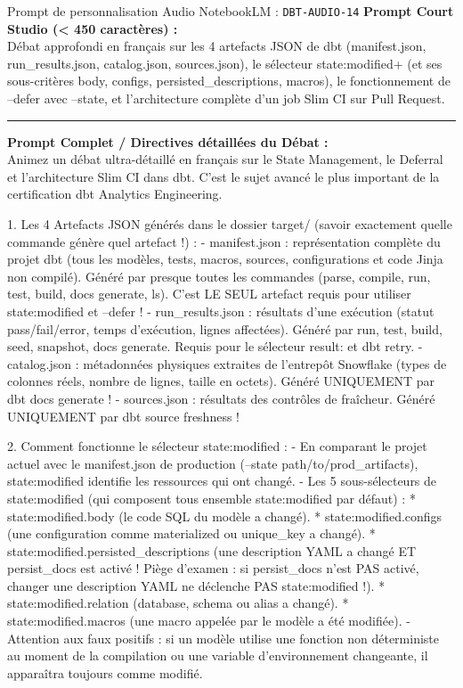 \documentclass[11pt,a4paper]{article}
\begin{document}
\begin{promptbox}{Prompt de personnalisation Audio NotebookLM : \texttt{DBT-AUDIO-14}}
\textbf{Prompt Court Studio (< 450 caractères) :}\\
Débat approfondi en français sur les 4 artefacts JSON de dbt (manifest.json, run\_results.json, catalog.json, sources.json), le sélecteur state:modified+ (et ses sous-critères body, configs, persisted\_descriptions, macros), le fonctionnement de --defer avec --state, et l'architecture complète d'un job Slim CI sur Pull Request.

\medskip\hrule\medskip
\textbf{Prompt Complet / Directives détaillées du Débat :}\\
Animez un débat ultra-détaillé en français sur le State Management, le Deferral et l'architecture Slim CI dans dbt. C'est le sujet avancé le plus important de la certification dbt Analytics Engineering.

1. Les 4 Artefacts JSON générés dans le dossier target/ (savoir exactement quelle commande génère quel artefact !) :
- manifest.json : représentation complète du projet dbt (tous les modèles, tests, macros, sources, configurations et code Jinja non compilé). Généré par presque toutes les commandes (parse, compile, run, test, build, docs generate, ls). C'est LE SEUL artefact requis pour utiliser state:modified et --defer !
- run\_results.json : résultats d'une exécution (statut pass/fail/error, temps d'exécution, lignes affectées). Généré par run, test, build, seed, snapshot, docs generate. Requis pour le sélecteur result: et dbt retry.
- catalog.json : métadonnées physiques extraites de l'entrepôt Snowflake (types de colonnes réels, nombre de lignes, taille en octets). Généré UNIQUEMENT par dbt docs generate !
- sources.json : résultats des contrôles de fraîcheur. Généré UNIQUEMENT par dbt source freshness !

2. Comment fonctionne le sélecteur state:modified :
- En comparant le projet actuel avec le manifest.json de production (--state path/to/prod\_artifacts), state:modified identifie les ressources qui ont changé.
- Les 5 sous-sélecteurs de state:modified (qui composent tous ensemble state:modified par défaut) :
  * state:modified.body (le code SQL du modèle a changé).
  * state:modified.configs (une configuration comme materialized ou unique\_key a changé).
  * state:modified.persisted\_descriptions (une description YAML a changé ET persist\_docs est activé ! Piège d'examen : si persist\_docs n'est PAS activé, changer une description YAML ne déclenche PAS state:modified !).
  * state:modified.relation (database, schema ou alias a changé).
  * state:modified.macros (une macro appelée par le modèle a été modifiée).
- Attention aux faux positifs : si un modèle utilise une fonction non déterministe au moment de la compilation ou une variable d'environnement changeante, il apparaîtra toujours comme modifié.


\end{promptbox}
\end{document}
